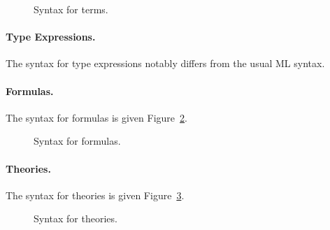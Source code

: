 
\begin{figure}[p]
  \begin{center}\framebox{}\end{center}
  \caption{Syntax for terms.}
\label{fig:bnf:term}
\end{figure}

\paragraph{Type Expressions.} The syntax for type
expressions notably differs from the usual ML syntax.
\begin{center}\framebox{}\end{center}

\paragraph{Formulas.}
The syntax for formulas is given Figure~\ref{fig:bnf:formula}.

\begin{figure}[p]
  \begin{center}\framebox{}\end{center}
  \caption{Syntax for formulas.}
\label{fig:bnf:formula}
\end{figure}


\paragraph{Theories.}
The syntax for theories is given Figure~\ref{fig:bnf:theory}.

\begin{figure}[p]
  \begin{center}\framebox{}\end{center}
  \caption{Syntax for theories.}
\label{fig:bnf:theory}
\end{figure}

